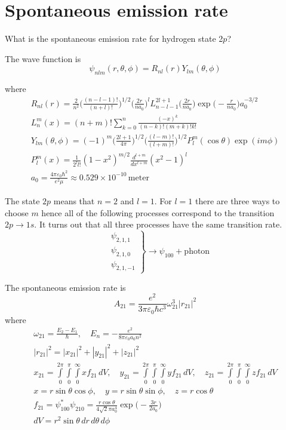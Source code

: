 \documentclass[12pt]{article}
\begin{document}
\section*{Spontaneous emission rate}

What is the spontaneous emission rate for hydrogen state 2$p$?

\bigskip
The wave function is
\begin{equation*}
\psi_{nlm}(r,\theta,\phi)=R_{nl}(r)Y_{lm}(\theta,\phi)
\end{equation*}

where
\begin{gather*}
R_{nl}(r)=
\frac{2}{n^2}
\biggl(\frac{(n-l-1)!}{(n+l)!}\biggr)^{1/2}
\biggl(\frac{2r}{na_0}\biggr)^l
L_{n-l-1}^{2l+1}\biggl(\frac{2r}{na_0}\biggr)
\exp\biggl(-\frac{r}{na_0}\biggr)
a_0^{-3/2}
\\
L_n^m(x)=(n+m)!\sum_{k=0}^n\frac{(-x)^k}{(n-k)!(m+k)!k!}
\\
Y_{lm}(\theta,\phi)=(-1)^m
\biggl(\frac{2l+1}{4\pi}\biggr)^{1/2}
\biggl(\frac{(l-m)!}{(l+m)!}\biggr)^{1/2}
P_l^m(\cos\theta)\exp(im\phi)
\\
P_l^m(x)=\frac{1}{2^l l!}(1-x^2)^{m/2}\frac{d^{l+m}}{dx^{l+m}}(x^2-1)^l
\\
a_0=\frac{4\pi\varepsilon_0\hbar^2}{e^2\mu}\approx0.529\times10^{-10}\,\text{meter}
\end{gather*}

The state $2p$ means that $n=2$ and $l=1$.
For $l=1$ there are three ways to choose $m$ hence all of the following processes correspond to the transition
$2p\rightarrow1s$.
It turns out that all three processes have the same transition rate.
\begin{equation*}
\left.\begin{aligned}
&\psi_{2,1,1}
\\
&\psi_{2,1,0}
\\
&\psi_{2,1,-1}
\end{aligned}\right\}\rightarrow\psi_{100}+\text{photon}
\end{equation*}

The spontaneous emission rate is
\begin{equation*}
A_{21}=\frac{e^2}{3\pi\varepsilon_0\hbar c^3}\omega_{21}^3|r_{21}|^2
\tag{1}
\end{equation*}
where
\begin{gather*}
\omega_{21}=\frac{E_2-E_1}{\hbar},\quad E_n=-\frac{e^2}{8\pi\varepsilon_0a_0n^2}
\\
|r_{21}|^2=|x_{21}|^2+|y_{21}|^2+|z_{21}|^2
\\
x_{21}=\int\limits_{0}^{2\pi}\int\limits_{0}^{\pi}\int\limits_{0}^{\infty}xf_{21}\,dV,
\quad
y_{21}=\int\limits_{0}^{2\pi}\int\limits_{0}^{\pi}\int\limits_{0}^{\infty}yf_{21}\,dV,
\quad
z_{21}=\int\limits_{0}^{2\pi}\int\limits_{0}^{\pi}\int\limits_{0}^{\infty}zf_{21}\,dV
\\
x=r\sin\theta\cos\phi,
\quad
y=r\sin\theta\sin\phi,
\quad
z=r\cos\theta
\\
f_{21}=\psi_{100}^*\psi_{210}=\frac{r\cos\theta}{4\sqrt2\pi a_0^4}\exp\biggl(-\frac{3r}{2a_0}\biggr)
\\
dV=r^2\sin\theta\,dr\,d\theta\,d\phi
\end{gather*}
\end{document}

